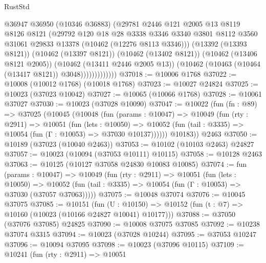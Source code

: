 \begin{lexlean}{RustStd}
\begin{coremodule}
                        @36947
                        @36950
                        (@10346 @36883)
                        (@29781
                          @2446
                          @121
                          @2005
                          @13
                          @8119
                          @8126
                          @8121
                          (@29792
                            @120
                            @18
                            @28
                            @3338
                            @3346
                            @3340
                            @3801
                            @8112
                            @3560
                            @31061
                            @29833
                            @13378
                            (@10462 (@12276 @8113 @3346)))
                          (@13392 (@13393 @8121))
                          (@10462 (@13397 @8121))
                          (@10462 (@13402 @8121))
                          (@10462 (@13406 @8121 @2005))
                          (@10462 (@13411 @2446 @2005 @13))
                          (@10462 (@10463 (@10464 (@13417 @8121)) @3048)))))))))))))
@37018 := @10006 @1768
@37022 := @10008 (@10012 @1768) (@10018 @1768)
@37023 := @10027 @24824
@37025 := @10023 (@37023 @10042)
@37027 := @10065 (@10066 @1768)
@37028 := @10061 @37027
@37030 := @10023 (@37028 @10090)
@37047 := @10022
    (fun (fn : @89) =>
    @37025
      (@10045
        (@10048
          (fun (params : @10047) =>
          @10049
            (fun (rty : @2911) =>
            @10051
              (fun (lets : @10050) =>
              @10052 (fun (tail : @3335) => @10054 (fun (Γ : @10053) => @37030 @10137))))))
        @10183))
    @2463
@37050 := @10189 (@37023 (@10040 @2463))
@37053 := @10102 (@10103 @2463) @24827
@37057 := @10023 (@10094 (@37053 @10111) @10115)
@37058 := @10128 @2463
@37063 := @10125 (@10127 @37058 @24830 @10083 @10085)
@37074 := fun (params : @10047) =>
  @10049
    (fun (rty : @2911) =>
    @10051
      (fun (lets : @10050) =>
      @10052 (fun (tail : @3335) => @10054 (fun (Γ : @10053) => @37030 (@37057 @37063)))))
@37075 := @10048 @37074
@37076 := @10045 @37075
@37085 := @10151
    (fun (U : @10150) => @10152 (fun (t : @7) => @10160 (@10023 (@10166 @24827 @10041) @10177)))
@37088 := @37050 (@37076 @37085) @24825
@37090 := @10008 @37075 @37085
@37092 := @10238 @37074 @3315
@37094 := @10023 (@37028 @10244)
@37095 := @37053 @10247
@37096 := @10094 @37095
@37098 := @10023 (@37096 @10115)
@37109 := @10241
    (fun (rty : @2911) =>
    @10051

\end{coremodule}
\end{lexlean}
